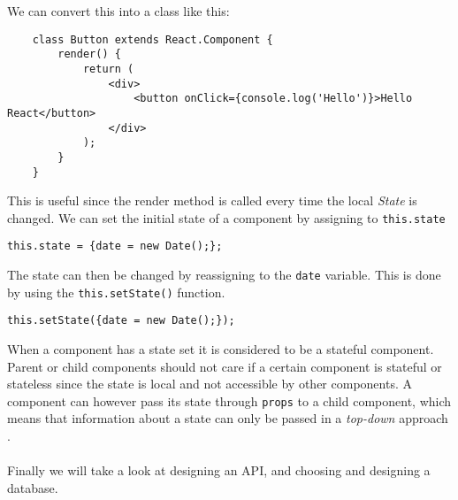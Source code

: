 We can convert this into a class like this:
\begin{lstlisting}
    class Button extends React.Component {
        render() {
            return (
                <div>
                    <button onClick={console.log('Hello')}>Hello React</button>
                </div>
            );
        }
    }
\end{lstlisting}
This is useful since the render method is called every time the local \textit{State} is changed.
We can set the initial state of a component by assigning to \texttt{this.state}
\begin{center}
    \texttt{this.state = \{date = new Date();\};}
\end{center}
The state can then be changed by reassigning to the \texttt{date} variable.
This is done by using the \texttt{this.setState()} function.
\begin{center}
    \texttt{this.setState(\{date = new Date();\});}
\end{center}
When a component has a state set it is considered to be a stateful component.
Parent or child components should not care if a certain component is stateful or stateless since the state is local and not accessible by other components.
A component can however pass its state through \texttt{props} to a child component, which means that information about a state can only be passed in a \textit{top-down} approach \cite{ReactJS}.
\\\\
Finally we will take a look at designing an API, and choosing and designing a database.
